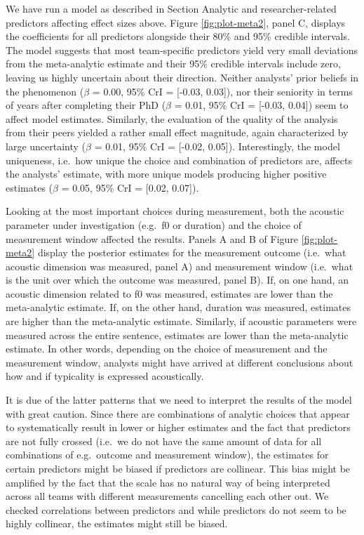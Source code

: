 \documentclass[Review,times,sageh]{sagej}
\begin{document}
We have run a model as described in Section Analytic and researcher-related predictors affecting effect sizes above.
Figure \ref{fig:plot-meta2}, panel C, displays the coefficients for all predictors alongside their 80\% and 95\% credible intervals.
The model suggests that most team-specific predictors yield very small deviations from the meta-analytic estimate and their 95\% credible intervals include zero, leaving us highly uncertain about their direction.
Neither analysts' prior beliefs in the phenomenon (\(\beta\) = 0.00, 95\% CrI = {[}-0.03, 0.03{]}), nor their seniority in terms of years after completing their PhD (\(\beta\) = 0.01, 95\% CrI = {[}-0.03, 0.04{]}) seem to affect model estimates.
Similarly, the evaluation of the quality of the analysis from their peers yielded a rather small effect magnitude, again characterized by large uncertainty (\(\beta\) = 0.01, 95\% CrI = {[}-0.02, 0.05{]}).
Interestingly, the model uniqueness, i.e.~how unique the choice and combination of predictors are, affects the analysts' estimate, with more unique models producing higher positive estimates (\(\beta\) = 0.05, 95\% CrI = {[}0.02, 0.07{]}).

Looking at the most important choices during measurement, both the acoustic parameter under investigation (e.g.~f0 or duration) and the choice of measurement window affected the results.
Panels A and B of Figure \ref{fig:plot-meta2} display the posterior estimates for the measurement outcome (i.e.~what acoustic dimension was measured, panel A) and measurement window (i.e.~what is the unit over which the outcome was measured, panel B).
If, on one hand, an acoustic dimension related to f0 was measured, estimates are lower than the meta-analytic estimate.
If, on the other hand, duration was measured, estimates are higher than the meta-analytic estimate.
Similarly, if acoustic parameters were measured across the entire sentence, estimates are lower than the meta-analytic estimate.
In other words, depending on the choice of measurement and the measurement window, analysts might have arrived at different conclusions about how and if typicality is expressed acoustically.

It is due of the latter patterns that we need to interpret the results of the model with great caution.
Since there are combinations of analytic choices that appear to systematically result in lower or higher estimates and the fact that predictors are not fully crossed (i.e.~we do not have the same amount of data for all combinations of e.g.~outcome and measurement window), the estimates for certain predictors might be biased if predictors are collinear.
This bias might be amplified by the fact that the scale has no natural way of being interpreted across all teams with different measurements cancelling each other out.
We checked correlations between predictors and while predictors do not seem to be highly collinear, the estimates might still be biased.
\end{document}
